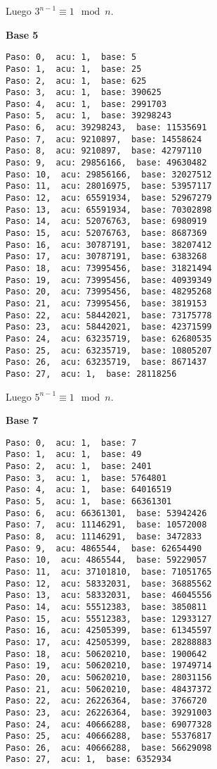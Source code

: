 \documentclass[a4paper]{article}
\begin{document}
Luego $3^{n-1}\equiv 1 \mod n$.

\textbf{Base 5}
\begin{verbatim}
Paso: 0,  acu: 1,  base: 5  
Paso: 1,  acu: 1,  base: 25  
Paso: 2,  acu: 1,  base: 625  
Paso: 3,  acu: 1,  base: 390625  
Paso: 4,  acu: 1,  base: 2991703  
Paso: 5,  acu: 1,  base: 39298243  
Paso: 6,  acu: 39298243,  base: 11535691  
Paso: 7,  acu: 9210897,  base: 14558624  
Paso: 8,  acu: 9210897,  base: 42797110  
Paso: 9,  acu: 29856166,  base: 49630482  
Paso: 10,  acu: 29856166,  base: 32027512  
Paso: 11,  acu: 28016975,  base: 53957117  
Paso: 12,  acu: 65591934,  base: 52967279  
Paso: 13,  acu: 65591934,  base: 70302898  
Paso: 14,  acu: 52076763,  base: 6980919  
Paso: 15,  acu: 52076763,  base: 8687369  
Paso: 16,  acu: 30787191,  base: 38207412  
Paso: 17,  acu: 30787191,  base: 6383268  
Paso: 18,  acu: 73995456,  base: 31821494  
Paso: 19,  acu: 73995456,  base: 40939349  
Paso: 20,  acu: 73995456,  base: 48295268  
Paso: 21,  acu: 73995456,  base: 3819153  
Paso: 22,  acu: 58442021,  base: 73175778  
Paso: 23,  acu: 58442021,  base: 42371599  
Paso: 24,  acu: 63235719,  base: 62680535  
Paso: 25,  acu: 63235719,  base: 10805207  
Paso: 26,  acu: 63235719,  base: 8671437  
Paso: 27,  acu: 1,  base: 28118256
\end{verbatim}

Luego $5^{n-1}\equiv 1 \mod n$.

\textbf{Base 7}
\begin{verbatim}
Paso: 0,  acu: 1,  base: 7  
Paso: 1,  acu: 1,  base: 49  
Paso: 2,  acu: 1,  base: 2401  
Paso: 3,  acu: 1,  base: 5764801  
Paso: 4,  acu: 1,  base: 64016519  
Paso: 5,  acu: 1,  base: 66361301  
Paso: 6,  acu: 66361301,  base: 53942426  
Paso: 7,  acu: 11146291,  base: 10572008  
Paso: 8,  acu: 11146291,  base: 3472833  
Paso: 9,  acu: 4865544,  base: 62654490  
Paso: 10,  acu: 4865544,  base: 59229057  
Paso: 11,  acu: 37101810,  base: 71051765  
Paso: 12,  acu: 58332031,  base: 36885562  
Paso: 13,  acu: 58332031,  base: 46045556  
Paso: 14,  acu: 55512383,  base: 3850811  
Paso: 15,  acu: 55512383,  base: 12933127  
Paso: 16,  acu: 42505399,  base: 61345597  
Paso: 17,  acu: 42505399,  base: 28288883  
Paso: 18,  acu: 50620210,  base: 1900642  
Paso: 19,  acu: 50620210,  base: 19749714  
Paso: 20,  acu: 50620210,  base: 28031156  
Paso: 21,  acu: 50620210,  base: 48437372  
Paso: 22,  acu: 26226364,  base: 3766720  
Paso: 23,  acu: 26226364,  base: 39291003  
Paso: 24,  acu: 40666288,  base: 69077328  
Paso: 25,  acu: 40666288,  base: 55376817  
Paso: 26,  acu: 40666288,  base: 56629098  
Paso: 27,  acu: 1,  base: 6352934  
\end{verbatim}
\end{document}
